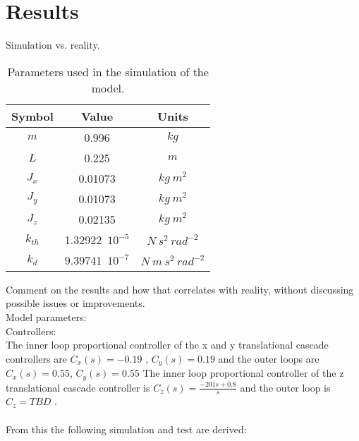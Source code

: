 \section{Results}
Simulation vs. reality. \\

\begin{table}[H]
    \centering
    \begin{tabular}{c|c|c}
        \textbf{Symbol} &\textbf{Value} &\textbf{Units}\\
        \hline %
         $m$ & 0.996       &$kg$\\
        \hline %
        $L$  &   0.225       & $m$\\
        \hline %
        $J_x$  & 0.01073       & $kg \  m^2$\\
        \hline %
        $J_y$  & 0.01073       & $kg \  m^2$\\
        \hline %
        $J_z$  & 0.02135       & $kg \  m^2$\\
        \hline %
        $k_{th}$  & 1.32922\ $10^{-5}$       & $N \  s^2 \  rad^{-2}$\\
        \hline %
        $k_{d}$  & 9.39741\ $10^{-7}$       & $N \  m \  s^2 \  rad^{-2}$\\
    \end{tabular}
    \caption{Parameters used in the simulation of the model.}
    \label{ParametersQuadcopter}
\end{table}

Comment on the results and how that correlates with reality, without discussing possible issues or improvements.\\
Model parameters: \\
Controllers:\\
The inner loop proportional controller of the x and y translational cascade controllers are $C_{\dot{x}}(s)= -0.19$
, $C_{\dot{y}}(s)= 0.19$ and the outer loops are $C_x(s)= 0.55$, $C_y(s)= 0.55$
The inner loop proportional controller of the z translational cascade controller is
$C_{\dot{z}}(s)=\frac{-201s+0.8}{s}$ and the outer loop is $C_z=TBD$ .\\ \\
From this the following simulation and test are derived: 